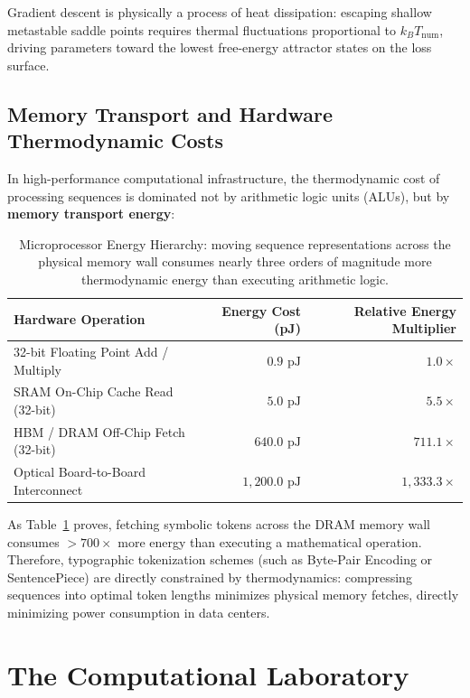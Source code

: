 \documentclass[11pt,letterpaper]{article}
\begin{document}
Gradient descent is physically a process of heat dissipation: escaping shallow metastable saddle points requires thermal fluctuations proportional to $k_B T_{\text{num}}$, driving parameters toward the lowest free-energy attractor states on the loss surface.

\subsection{Memory Transport and Hardware Thermodynamic Costs}
In high-performance computational infrastructure, the thermodynamic cost of processing sequences is dominated not by arithmetic logic units (ALUs), but by \textbf{memory transport energy}:

\begin{table}[htbp]
\centering
\small
\begin{tabular}{lrr}
\toprule
\textbf{Hardware Operation} & \textbf{Energy Cost (pJ)} & \textbf{Relative Energy Multiplier} \\
\midrule
32-bit Floating Point Add / Multiply & $0.9\text{ pJ}$ & $1.0\times$ \\
SRAM On-Chip Cache Read (32-bit) & $5.0\text{ pJ}$ & $5.5\times$ \\
HBM / DRAM Off-Chip Fetch (32-bit) & $640.0\text{ pJ}$ & $711.1\times$ \\
Optical Board-to-Board Interconnect & $1{,}200.0\text{ pJ}$ & $1{,}333.3\times$ \\
\bottomrule
\end{tabular}
\caption{Microprocessor Energy Hierarchy: moving sequence representations across the physical memory wall consumes nearly three orders of magnitude more thermodynamic energy than executing arithmetic logic.}
\label{tab:memory_energy}
\end{table}

As Table~\ref{tab:memory_energy} proves, fetching symbolic tokens across the DRAM memory wall consumes $>700\times$ more energy than executing a mathematical operation. Therefore, typographic tokenization schemes (such as Byte-Pair Encoding or SentencePiece) are directly constrained by thermodynamics: compressing sequences into optimal token lengths minimizes physical memory fetches, directly minimizing power consumption in data centers.

\section{The Computational Laboratory}
\end{document}
